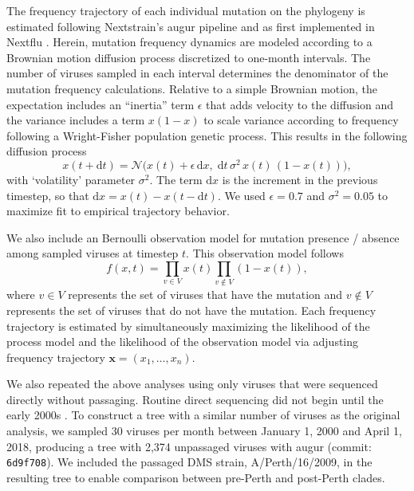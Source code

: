 \documentclass[9pt,twoside,lineno]{pnas-new}
\begin{document}
\newcommand{\dx}{\mathrm{d}x}						%
\newcommand{\dy}{\mathrm{d}y}						%
\newcommand{\dt}{\mathrm{d}t}						%
\newcommand{\inertia}{\epsilon}			    %
\newcommand{\normal}{\mathcal{N}}				%

The frequency trajectory of each individual mutation on the phylogeny is estimated following Nextstrain's augur pipeline and as first implemented in Nextflu \cite{neher2015nextflu}.
Herein, mutation frequency dynamics are modeled according to a Brownian motion diffusion process discretized to one-month intervals.
The number of viruses sampled in each interval determines the denominator of the mutation frequency calculations.
Relative to a simple Brownian motion, the expectation includes an ``inertia'' term $\inertia$ that adds velocity to the diffusion and the variance includes a term $x(1-x)$ to scale variance according to frequency following a Wright-Fisher population genetic process.
This results in the following diffusion process
\begin{equation}
x(t+\dt) = \normal\big( x(t) + \inertia \, \dx , \; \dt \, \sigma^2 \, x(t) \, (1-x(t)) \big),
\end{equation}
with `volatility' parameter $\sigma^2$.
The term $\dx$ is the increment in the previous timestep, so that $\dx = x(t) - x(t-\dt)$.
We used $\inertia = 0.7$ and $\sigma^2 = 0.05$ to maximize fit to empirical trajectory behavior.

We also include an Bernoulli observation model for mutation presence / absence among sampled viruses at timestep $t$.
This observation model follows
\begin{equation}
f(x,t) = \prod_{v\in V} x(t) \prod_{v\notin V} (1-x(t)),
\end{equation}
where $v\in V$ represents the set of viruses that have the mutation and $v\notin V$ represents the set of viruses that do not have the mutation.
Each frequency trajectory is estimated by simultaneously maximizing the likelihood of the process model and the likelihood of the observation model via adjusting frequency trajectory $\mathbf{x}=(x_1, \ldots, x_n)$.

We also repeated the above analyses using only viruses that were sequenced directly without passaging.
Routine direct sequencing did not begin until the early 2000s \cite{mcwhite2016sequence}.
To construct a tree with a similar number of viruses as the original analysis, we sampled 30 viruses per month between January 1, 2000 and April 1, 2018, producing a tree with 2,374 unpassaged viruses with augur (commit: \texttt{6d9f708}).
We included the passaged DMS strain, A/Perth/16/2009, in the resulting tree to enable comparison between pre-Perth and post-Perth clades.
\end{document}
